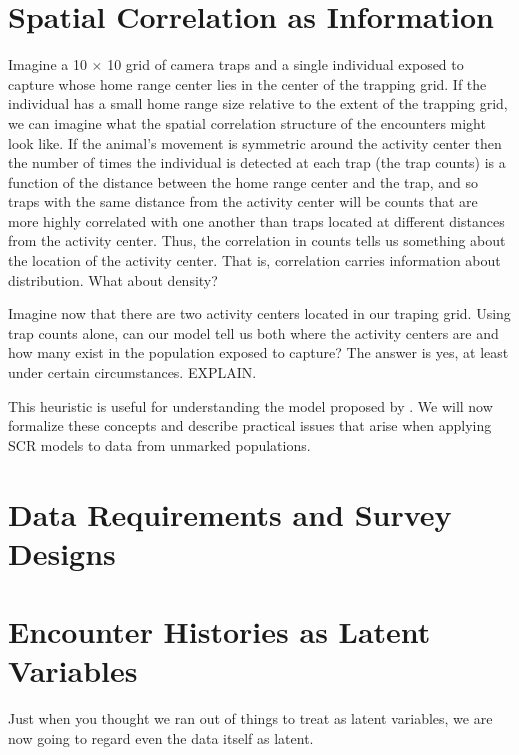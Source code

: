 \section{Spatial Correlation as Information}


Imagine a 10 $\times$ 10 grid of camera traps and a single individual
exposed to capture whose home range center lies in the center of the
trapping grid. If the individual has a small home range size relative
to the extent of the trapping grid, we can imagine what the
spatial correlation structure of the encounters might look
like. If the animal's movement is symmetric around the activity center
then the number of times the individual is detected at each
trap (the trap counts) is a function of the distance between the home
range center and the trap, and so traps with the same distance from the
activity center will be counts that are more highly correlated with
one another than traps located at different distances from the
activity center. Thus, the correlation in counts tells us something
about the location of the activity center. That is, correlation
carries information about distribution. What about density?

Imagine now that there are two activity centers located in our traping
grid. Using trap counts alone, can our model tell us both where the
activity centers are and how many exist in the population exposed to
capture? The answer is yes, at least under certain circumstances. 
EXPLAIN.

This heuristic is useful for understanding the model proposed by
\citet{chandler_royle:2012}. We will now formalize these concepts and
describe practical issues that arise when applying SCR
models to data from unmarked populations.



\section{Data Requirements and Survey Designs}






\section{Encounter Histories as Latent Variables}

Just when you thought we ran out of things to treat as latent
variables, we are now going to regard even the data itself as latent.


